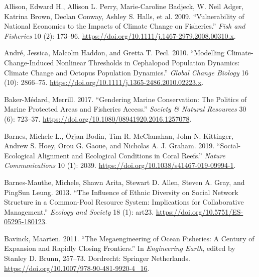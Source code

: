 \documentclass[
]{article}
\newlength{\cslhangindent}
\newlength{\cslentryspacingunit} %
\newenvironment{CSLReferences}[2] %
 {%
  \setlength{\parindent}{0pt}
  \ifodd #1
  \let\oldpar\par
  \def\par{\hangindent=\cslhangindent\oldpar}
  \fi
  \setlength{\parskip}{#2\cslentryspacingunit}
 }%
 {}
\begin{document}
\hypertarget{refs}{}
\begin{CSLReferences}{1}{0}
\leavevmode{}%
Allison, Edward H., Allison L. Perry, Marie-Caroline Badjeck, W. Neil Adger, Katrina Brown, Declan Conway, Ashley S. Halls, et al. 2009. {``Vulnerability of National Economies to the Impacts of Climate Change on Fisheries.''} \emph{Fish and Fisheries} 10 (2): 173--96. \url{https://doi.org/10.1111/j.1467-2979.2008.00310.x}.

\leavevmode{}%
André, Jessica, Malcolm Haddon, and Gretta T. Pecl. 2010. {``Modelling Climate-Change-Induced Nonlinear Thresholds in Cephalopod Population Dynamics: {Climate} Change and Octopus Population Dynamics.''} \emph{Global Change Biology} 16 (10): 2866--75. \url{https://doi.org/10.1111/j.1365-2486.2010.02223.x}.

\leavevmode{}%
Baker-Médard, Merrill. 2017. {``Gendering {Marine} {Conservation}: {The} {Politics} of {Marine} {Protected} {Areas} and {Fisheries} {Access}.''} \emph{Society \& Natural Resources} 30 (6): 723--37. \url{https://doi.org/10.1080/08941920.2016.1257078}.

\leavevmode{}%
Barnes, Michele L., Örjan Bodin, Tim R. McClanahan, John N. Kittinger, Andrew S. Hoey, Orou G. Gaoue, and Nicholas A. J. Graham. 2019. {``Social-Ecological Alignment and Ecological Conditions in Coral Reefs.''} \emph{Nature Communications} 10 (1): 2039. \url{https://doi.org/10.1038/s41467-019-09994-1}.

\leavevmode{}%
Barnes-Mauthe, Michele, Shawn Arita, Stewart D. Allen, Steven A. Gray, and PingSun Leung. 2013. {``The {Influence} of {Ethnic} {Diversity} on {Social} {Network} {Structure} in a {Common}-{Pool} {Resource} {System}: {Implications} for {Collaborative} {Management}.''} \emph{Ecology and Society} 18 (1): art23. \url{https://doi.org/10.5751/ES-05295-180123}.

\leavevmode{}%
Bavinck, Maarten. 2011. {``The {Megaengineering} of {Ocean} {Fisheries}: {A} {Century} of {Expansion} and {Rapidly} {Closing} {Frontiers}.''} In \emph{Engineering {Earth}}, edited by Stanley D. Brunn, 257--73. Dordrecht: Springer Netherlands. \url{https://doi.org/10.1007/978-90-481-9920-4_16}.


\end{CSLReferences}
\end{document}
